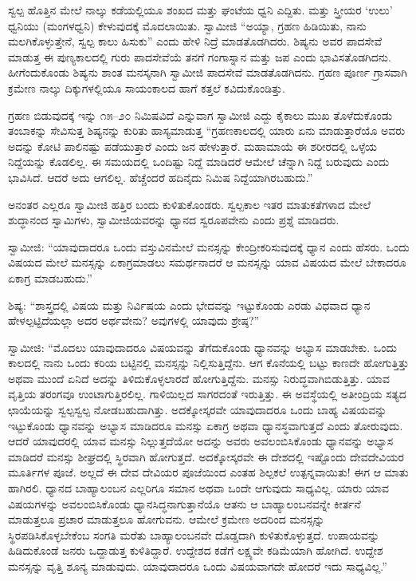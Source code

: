  ಸ್ವಲ್ಪ ಹೊತ್ತಿನ ಮೇಲೆ ನಾಲ್ಕು ಕಡೆಯಲ್ಲಿಯೂ ಶಂಖದ ಮತ್ತು ಘಂಟೆಯ ಧ್ವನಿ ಎದ್ದಿತು. ಮತ್ತು ಸ್ತ್ರೀಯರ ‘ಉಲು’ ಧ್ವನಿಯು (ಮಂಗಳಧ್ವನಿ) ಕೇಳುವುದಕ್ಕೆ ಮೊದಲಾಯಿತು. ಸ್ವಾಮೀಜಿ “ಅಯ್ಯಾ, ಗ್ರಹಣ ಹಿಡಿಯಿತು, ನಾನು ಮಲಗಿಕೊಳ್ಳುತ್ತೇನೆ, ಸ್ವಲ್ಪ ಕಾಲು ಹಿಸುಕು” ಎಂದು ಹೇಳಿ ನಿದ್ರೆ ಮಾಡತೊಡಗಿದರು. ಶಿಷ್ಯನು ಅವರ ಪಾದಸೇವೆ ಮಾಡುತ್ತ ಈ ಪುಣ್ಯಕಾಲದಲ್ಲಿ ಗುರು ಪಾದಸೇವೆಯೆ ತನಗೆ ಗಂಗಾಸ್ನಾನ ಮತ್ತು ಜಪ ಎಂದು ಭಾವಿಸತೊಡಗಿದನು. ಹೀಗೆಂದುಕೊಂಡು ಶಿಷ್ಯನು ಶಾಂತ ಮನಸ್ಕನಾಗಿ ಸ್ವಾಮೀಜಿ ಪಾದಸೇವೆ ಮಾಡತೊಡಗಿದನು. ಗ್ರಹಣ ಪೂರ್ಣ ಗ್ರಾಸವಾಗಿ ಕ್ರಮೇ‌ಣ ನಾಲ್ಕು ದಿಕ್ಕುಗಳಲ್ಲಿಯೂ ಸಾಯಂಕಾಲದ ಹಾಗೆ ಕತ್ತಲೆ ಕವಿದುಕೊಂಡಿತ್ತು. 

ಗ್ರಹಣ ಬಿಡುವುದಕ್ಕೆ ಇನ್ನು ೧೫–೨೦ ನಿಮಿಷವಿದೆ ಎನ್ನುವಾಗ ಸ್ವಾಮೀಜಿ ಎದ್ದು ಕೈಕಾಲು ಮುಖ ತೊಳೆದುಕೊಂಡು ತಂಬಾಕನ್ನು ಸೇವಿಸುತ್ತ ಶಿಷ್ಯನನ್ನು ಕುರಿತು ಹಾಸ್ಯಮಾಡುತ್ತ “ಗ್ರಹಣಕಾಲದಲ್ಲಿ ಯಾರು ಏನು ಮಾಡುತ್ತಾರೆಯೊ ಅವರು ಅದನ್ನು ಕೋಟಿ ಪಾಲಿನಷ್ಟು ಪಡೆಯುತ್ತಾರೆ ಎಂದು ಜನ ಹೇಳುತ್ತಾರೆ. ಮಹಾಮಾಯೆ ಈ ಶರೀರದಲ್ಲಿ ಒಳ್ಳೆಯ ನಿದ್ದೆಯನ್ನು ಕೊಡಲಿಲ್ಲ. ಈ ಸಮಯದಲ್ಲಿ ಒಂದಿಷ್ಟು ನಿದ್ದೆ ಮಾಡಿದರೆ ಆಮೇಲೆ ಚೆನ್ನಾಗಿ ನಿದ್ದೆ ಬರುವುದು ಎಂದು ಭಾವಿಸಿದೆ. ಆದರೆ ಅದು ಆಗಲಿಲ್ಲ. ಹೆಚ್ಚೆಂದರೆ ಹದಿನೈದು ನಿಮಿಷ ನಿದ್ದೆಯಾಗಿರಬಹುದು.” 

 ಅನಂತರ ಎಲ್ಲರೂ ಸ್ವಾಮೀಜಿ ಹತ್ತಿರ ಬಂದು ಕುಳಿತುಕೊಂಡರು. ಸ್ವಲ್ಪಕಾಲ ಇತರ ಮಾತುಕತೆಗಳಾದ ಮೇಲೆ ಶುದ್ಧಾನಂದ ಸ್ವಾಮಿಗಳು, ಸ್ವಾಮೀಜಿಯವರನ್ನು ಧ್ಯಾನದ ಸ್ವರೂಪವೇನು ಎಂದು ಪ್ರಶ್ನೆ ಮಾಡಿದರು. 

 ಸ್ವಾಮೀಜಿ: “ಯಾವುದಾದರೂ ಒಂದು ವಸ್ತುವಿನಮೇಲೆ ಮನಸ್ಸನ್ನು ಕೇಂದ್ರೀಕರಿಸುವುದಕ್ಕೆ ಧ್ಯಾನ ಎಂದು ಹೆಸರು. ಒಂದು ವಿಷಯದ ಮೇಲೆ ಮನಸ್ಸನ್ನು ಏಕಾಗ್ರಮಾಡಲು ಸಮರ್ಥನಾದರೆ ಆ ಮನಸ್ಸನ್ನು ಯಾವ ವಿಷಯದ ಮೇಲೆ ಬೇಕಾದರೂ ಏಕಾಗ್ರ ಮಾಡಬಹುದು.” 

 ಶಿಷ್ಯ: “ಶಾಸ್ತ್ರದಲ್ಲಿ ವಿಷಯ ಮತ್ತು ನಿರ್ವಿಷಯ ಎಂದು ಭೇದವನ್ನು ಇಟ್ಟುಕೊಂಡು ಎರಡು ವಿಧವಾದ ಧ್ಯಾನ ಹೇಳಲ್ಪಟ್ಟಿದೆಯಲ್ಲಾ ಅದರ ಅರ್ಥವೇನು? ಅವುಗಳಲ್ಲಿ ಯಾವುದು ಶ್ರೇಷ್ಠ?” 

 ಸ್ವಾಮೀಜಿ: “ಮೊದಲು ಯಾವುದಾದರೂ ವಿಷಯವನ್ನು ತೆಗೆದುಕೊಂಡು ಧ್ಯಾನವನ್ನು ಅಭ್ಯಾಸ ಮಾಡಬೇಕು. ಒಂದು ಕಾಲದಲ್ಲಿ ನಾನು ಒಂದು ಕರಿಯ ಬಟ್ಟಿನಲ್ಲಿ ಮನಸ್ಸನ್ನು ನಿಲ್ಲಿಸುತ್ತಿದ್ದೆನು. ಆಗ ಕೊನೆಯಲ್ಲಿ ಬಟ್ಟು ಕಾಣದೇ ಹೋಗುತ್ತಿತ್ತು ಅಥವಾ ಮುಂದೆ ಏನಿದೆ ಅದನ್ನು ತಿಳಿದುಕೊಳ್ಳಲಾರದೆ ಹೋಗುತ್ತಿದ್ದೆನು. ಮನಸ್ಸು ನಿರುದ್ಧವಾಗಿಬಿಡುತ್ತಿತ್ತು. ಯಾವ ವೃತ್ತಿಯ ತರಂಗವೂ ಉಂಟಾಗುತ್ತಿರಲಿಲ್ಲ. ಗಾಳಿಯಿಲ್ಲದ ಸಾಗರದಂತೆ ಇರುತ್ತಿತ್ತು. ಈ ಅವಸ್ಥೆಯಲ್ಲಿ ಅತೀಂದ್ರಿಯ ಸತ್ಯದ ಛಾಯೆಯನ್ನು ಸ್ವಲ್ಪಸ್ವಲ್ಪ ನೋಡಬಹುದಾಗಿತ್ತು. ಅದಕ್ಕೋಸ್ಕರವೇ ಯಾವುದಾದರೂ ಒಂದು ಬಾಹ್ಯ ವಿಷಯವನ್ನು ಇಟ್ಟುಕೊಂಡು ಧ್ಯಾನವನ್ನು ಅಭ್ಯಾಸ ಮಾಡಿದರೂ ಮನಸ್ಸು ಏಕಾಗ್ರ ಅಥವಾ ಧ್ಯಾನಸ್ಥವಾಗುತ್ತದೆ ಎಂದು ತೋರುವುದು. ಆದರೆ ಯಾವುದರಲ್ಲಿ ಯಾವ ಮನಸ್ಸು ನಿಲ್ಲುತ್ತದೆಯೋ ಅದನ್ನು ಅವರು ಅವಲಂಬಿಸಿಕೊಂಡು ಧ್ಯಾನವನ್ನು ಅಭ್ಯಾಸ ಮಾಡಿದರೆ ಮನಸ್ಸು ಶೀಘ್ರದಲ್ಲಿ ಸ್ಥಿರವಾಗಿ ಹೋಗುತ್ತದೆ. ಅದಕ್ಕೋಸ್ಕರವೇ ಈ ದೇಶದಲ್ಲಿ ಇಷ್ಟೊಂದು ದೇವದೇವಿಯರ ಮೂರ್ತಿಗಳ ಪೂಜೆ. ಅಲ್ಲದೆ ಈ ದೇವ ದೇವಿಯರ ಪೂಜೆಯಿಂದ ಎಂತಹ ಶಿಲ್ಪಕಲೆ ಉತ್ಪನ್ನವಾಯಿತು! ಈಗ ಆ ಮಾತು ಹಾಗಿರಲಿ. ಧ್ಯಾನದ ಬಾಹ್ಯಾಲಂಬನ ಎಲ್ಲರಿಗೂ ಸಮಾನ ಅಥವಾ ಒಂದೇ ಆಗುವುದು ಸಾಧ್ಯವಿಲ್ಲ. ಯಾರು ಯಾವ ವಿಷಯಗಳನ್ನು ಅವಲಂಬಿಸಿಕೊಂಡು ಧ್ಯಾನಸಿದ್ಧನಾಗುತ್ತಾನೆಯೊ ಆತನು ಆ ಬಾಹ್ಯಾಲಂಬನವನ್ನೇ ಕೀರ್ತನೆ ಮಾಡುತ್ತಲೂ ಪ್ರಚಾರ ಮಾಡುತ್ತಲೂ ಹೋಗುವನು. ಆಮೇಲೆ ಕ್ರಮೇಣ ಅದರಿಂದ ಮನಸ್ಸನ್ನು ಸ್ಥಿರಪಡಿಸಿಕೊಳ್ಳಬೇಕೆಂಬ ಸಂಗತಿ ಮರೆತು ಬಾಹ್ಯಾಲಂಬನವೇ ದೊಡ್ಡದಾಗಿ ಕುಳಿತುಕೊಳ್ಳುತ್ತದೆ. ಉಪಾಯವನ್ನು ಹಿಡಿದುಕೊಂಡೆ ಜನರು ಒದ್ದಾಡುತ್ತ ಕುಳಿತಿದ್ದಾರೆ. ಉದ್ದೇಶದ ಕಡೆಗೆ ಲಕ್ಷ್ಯವೇ ಕಡಿಮೆಯಾಗಿ ಹೋಗಿದೆ. ಉದ್ದೇಶ ಮನಸ್ಸನ್ನು ವೃತ್ತಿ ಶೂನ್ಯ ಮಾಡುವುದು. ಯಾವುದಾದರೂ ಒಂದು ವಿಷಯವಾಗದೇ ಹೋದರೆ ಇದು ಸಾಧ್ಯವಿಲ್ಲ.” 

